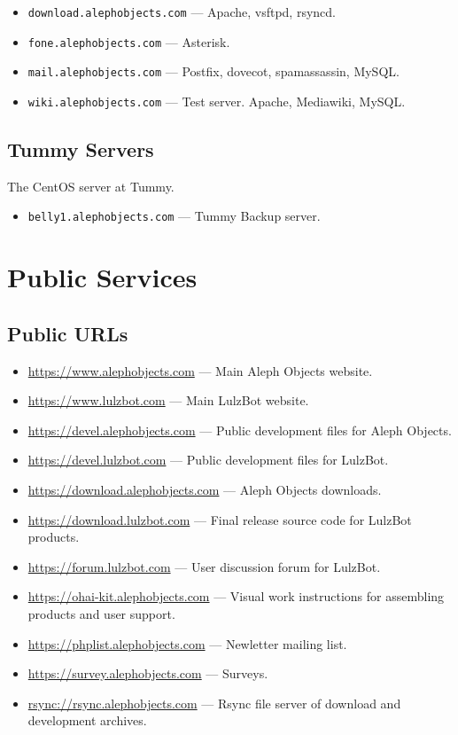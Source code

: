 \begin{itemize}
\item \texttt{download.alephobjects.com} --- Apache, vsftpd, rsyncd.
\item \texttt{fone.alephobjects.com} --- Asterisk.
\item \texttt{mail.alephobjects.com} --- Postfix, dovecot, spamassassin, MySQL.
\item \texttt{wiki.alephobjects.com} --- Test server. Apache, Mediawiki, MySQL.
\end{itemize}

\subsection{Tummy Servers}
The CentOS server at Tummy.

\begin{itemize}
\item \texttt{belly1.alephobjects.com} --- Tummy Backup server.
\end{itemize}

\section{Public Services}
\subsection{Public URLs}
\begin{itemize}
\item \url{https://www.alephobjects.com} --- Main Aleph Objects website.
\item \url{https://www.lulzbot.com} --- Main LulzBot website.
\item \url{https://devel.alephobjects.com} --- Public development files for
       Aleph Objects.
\item \url{https://devel.lulzbot.com} --- Public development files for LulzBot.
\item \url{https://download.alephobjects.com} --- Aleph Objects downloads.
\item \url{https://download.lulzbot.com} --- Final release source code for
       LulzBot products.
\item \url{https://forum.lulzbot.com} --- User discussion forum for LulzBot.
\item \url{https://ohai-kit.alephobjects.com} --- Visual work instructions for
       assembling products and user support.
\item \url{https://phplist.alephobjects.com} --- Newletter mailing list.
\item \url{https://survey.alephobjects.com} --- Surveys.
\item \url{rsync://rsync.alephobjects.com} --- Rsync file server of download
       and development archives.
\end{itemize}

